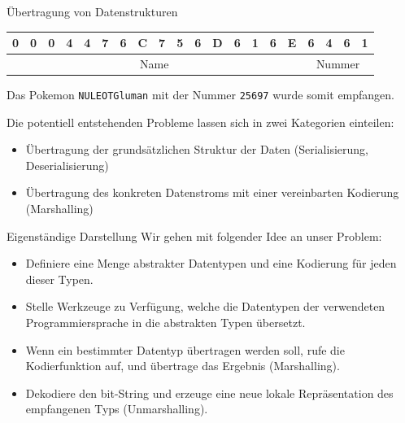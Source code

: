\begin{example}{Übertragung von Datenstrukturen}
    \begin{center}
        \begin{tabular}{|c|c|c|c|c|c|c|c|c|c|c|c|c|c|c|c|c|c|c|c|}
            \hline
            0                          & 0                            & 0 & 4 & 4 & 7 & 6 & C & 7 & 5 & 6 & D & 6 & 1 & 6 & E & 6 & 4 & 6 & 1 \\\hline
            \multicolumn{16}{|c}{Name} & \multicolumn{4}{|c|}{Nummer}                                                                         \\\hline
        \end{tabular}
    \end{center}

    Das Pokemon \texttt{NULEOTGluman} mit der Nummer \texttt{25697} wurde somit empfangen.

    Die potentiell entstehenden Probleme lassen sich in zwei Kategorien einteilen:

    \begin{itemize}
        \item Übertragung der grundsätzlichen Struktur der Daten (Serialisierung, Deserialisierung)
        \item Übertragung des konkreten Datenstroms mit einer vereinbarten Kodierung (Marshalling)
    \end{itemize}
\end{example}

\begin{bonus}{Eigenständige Darstellung}
    Wir gehen mit folgender Idee an unser Problem:

    \begin{itemize}
        \item Definiere eine Menge abstrakter Datentypen und eine Kodierung für jeden dieser Typen.
        \item Stelle Werkzeuge zu Verfügung, welche die Datentypen der verwendeten Programmiersprache in die abstrakten Typen übersetzt.
        \item Wenn ein bestimmter Datentyp übertragen werden soll, rufe die Kodierfunktion auf, und übertrage das Ergebnis (Marshalling).
        \item Dekodiere den bit-String und erzeuge eine neue lokale Repräsentation des empfangenen Typs (Unmarshalling).
    \end{itemize}
\end{bonus}

